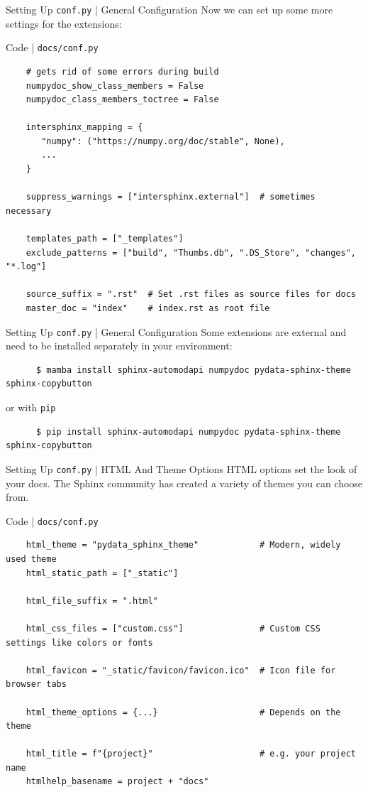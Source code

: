\begin{frame}[fragile]{Setting Up \texttt{conf.py} | General Configuration}
  Now we can set up some more settings for the extensions:
  \begin{block}{Code | \texttt{docs/conf.py}}
    \begin{verbatim}
    # gets rid of some errors during build
    numpydoc_show_class_members = False
    numpydoc_class_members_toctree = False

    intersphinx_mapping = {
       "numpy": ("https://numpy.org/doc/stable", None),
       ...
    }

    suppress_warnings = ["intersphinx.external"]  # sometimes necessary

    templates_path = ["_templates"]
    exclude_patterns = ["build", "Thumbs.db", ".DS_Store", "changes", "*.log"]

    source_suffix = ".rst"  # Set .rst files as source files for docs
    master_doc = "index"    # index.rst as root file
  \end{verbatim}
  \end{block}
\end{frame}


\begin{frame}[fragile]{Setting Up \texttt{conf.py} | General Configuration}
    Some extensions are external and need to be installed separately in your environment:
    \begin{verbatim}
      $ mamba install sphinx-automodapi numpydoc pydata-sphinx-theme sphinx-copybutton
    \end{verbatim}
    or with \texttt{pip}
    \begin{verbatim}
      $ pip install sphinx-automodapi numpydoc pydata-sphinx-theme sphinx-copybutton
    \end{verbatim}
\end{frame}


\begin{frame}[fragile]{Setting Up \texttt{conf.py} | HTML And Theme Options}
  HTML options set the look of your docs. The Sphinx community has created a variety of
  themes you can choose from.
  \begin{block}{Code | \texttt{docs/conf.py}}
  \footnotesize
  \begin{verbatim}
    html_theme = "pydata_sphinx_theme"            # Modern, widely used theme
    html_static_path = ["_static"]

    html_file_suffix = ".html"

    html_css_files = ["custom.css"]               # Custom CSS settings like colors or fonts

    html_favicon = "_static/favicon/favicon.ico"  # Icon file for browser tabs

    html_theme_options = {...}                    # Depends on the theme

    html_title = f"{project}"                     # e.g. your project name
    htmlhelp_basename = project + "docs"
  \end{verbatim}
  \end{block}
\end{frame}




